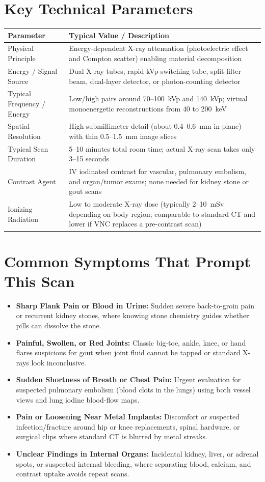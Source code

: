 \section{Key Technical Parameters}
\noindent
\begin{tabularx}{\textwidth}{@{}l X@{}}
\toprule
\textbf{Parameter} & \textbf{Typical Value / Description} \\
\midrule
Physical Principle & Energy-dependent X-ray attenuation (photoelectric effect and Compton scatter) enabling material decomposition \\
Energy / Signal Source & Dual X-ray tubes, rapid kVp-switching tube, split-filter beam, dual-layer detector, or photon-counting detector \\
Typical Frequency / Energy & Low/high pairs around 70--100~kVp and 140~kVp; virtual monoenergetic reconstructions from 40 to 200~keV \\
Spatial Resolution & High submillimeter detail (about 0.4--0.6~mm in-plane) with thin 0.5--1.5~mm image slices \\
Typical Scan Duration & 5--10 minutes total room time; actual X-ray scan takes only 3--15 seconds \\
Contrast Agent & IV iodinated contrast for vascular, pulmonary embolism, and organ/tumor exams; none needed for kidney stone or gout scans \\
Ionizing Radiation & Low to moderate X-ray dose (typically 2--10~mSv depending on body region; comparable to standard CT and lower if VNC replaces a pre-contrast scan) \\
\bottomrule
\end{tabularx}

\section{Common Symptoms That Prompt This Scan}
\begin{itemize}
\item \textbf{Sharp Flank Pain or Blood in Urine:} Sudden severe back-to-groin pain or recurrent kidney stones, where knowing stone chemistry guides whether pills can dissolve the stone.
\item \textbf{Painful, Swollen, or Red Joints:} Classic big-toe, ankle, knee, or hand flares suspicious for gout when joint fluid cannot be tapped or standard X-rays look inconclusive.
\item \textbf{Sudden Shortness of Breath or Chest Pain:} Urgent evaluation for suspected pulmonary embolism (blood clots in the lungs) using both vessel views and lung iodine blood-flow maps.
\item \textbf{Pain or Loosening Near Metal Implants:} Discomfort or suspected infection/fracture around hip or knee replacements, spinal hardware, or surgical clips where standard CT is blurred by metal streaks.
\item \textbf{Unclear Findings in Internal Organs:} Incidental kidney, liver, or adrenal spots, or suspected internal bleeding, where separating blood, calcium, and contrast uptake avoids repeat scans.
\end{itemize}

